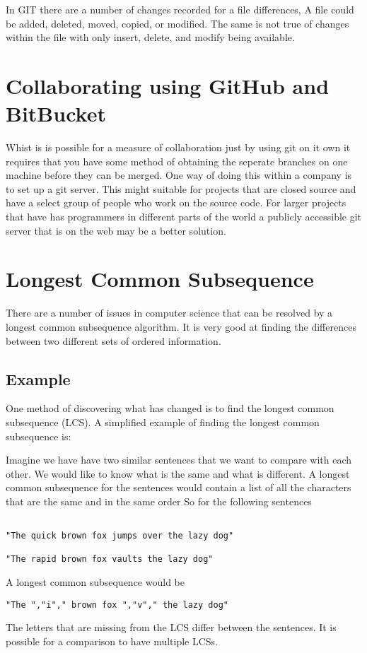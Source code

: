 In GIT there are a number of changes recorded for a file differences,  A file could be added, deleted, moved, copied, or modified.  The same is not true of changes within the file with only insert, delete, and modify being available.


\section{Collaborating using GitHub and BitBucket}
Whist is is possible for a measure of collaboration just by using git on it own it requires that you have some method of obtaining the seperate branches on one machine before they can be merged.  One way of doing this within a company is to set up a git server.  This might suitable for projects that are closed source and have a select group of people who work on the source code.  For larger projects that have has programmers in different parts of the world a publicly accessible git server that is on the web may be a better solution.  


\section{Longest Common Subsequence}
There are a number of issues in computer science that can be resolved by a longest common subsequence algorithm.
It is very good at finding the differences between two different sets of ordered information.


\subsection{Example}
One method of discovering what has changed is to find the longest common subsequence (LCS).
A simplified example of finding the longest common subsequence is:

Imagine we have have two similar sentences that we want to compare with each other.  
We would like to know what is the same and what is different.
A longest common subsequence for the sentences would contain a list of all the characters that are the same and in the same order
So for the following sentences

\begin{verbatim}

"The quick brown fox jumps over the lazy dog"

"The rapid brown fox vaults the lazy dog"

\end{verbatim}
A longest common subsequence would be
\begin{verbatim}
"The ","i"," brown fox ","v"," the lazy dog"
\end{verbatim}
The letters that are missing from the LCS differ between the sentences.
It is possible for a comparison to have multiple LCSs.

